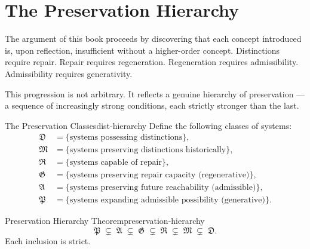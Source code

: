 \documentclass[12pt,twoside,openright]{book}
\begin{document}
\section{The Preservation Hierarchy}
\label{sec:ch30-hierarchy}

The argument of this book proceeds by discovering that
each concept introduced is, upon reflection, insufficient
without a higher-order concept. Distinctions require
repair. Repair requires regeneration. Regeneration
requires admissibility. Admissibility requires generativity.

This progression is not arbitrary. It reflects a genuine
hierarchy of preservation — a sequence of increasingly
strong conditions, each strictly stronger than the last.

\begin{definition}{The Preservation Classes}{dist-hierarchy}
  Define the following classes of systems:
  \begin{align*}
    \mathfrak{D} &= \{\text{systems possessing distinctions}\}, \\
    \mathfrak{M} &= \{\text{systems preserving distinctions historically}\}, \\
    \mathfrak{R} &= \{\text{systems capable of repair}\}, \\
    \mathfrak{G} &= \{\text{systems preserving repair capacity (regenerative)}\}, \\
    \mathfrak{A} &= \{\text{systems preserving future reachability (admissible)}\}, \\
    \mathfrak{P} &= \{\text{systems expanding admissible possibility (generative)}\}.
  \end{align*}
\end{definition}

\begin{theorem}{Preservation Hierarchy Theorem}{preservation-hierarchy}
  \[
    \mathfrak{P}
    \;\subsetneq\;
    \mathfrak{A}
    \;\subsetneq\;
    \mathfrak{G}
    \;\subsetneq\;
    \mathfrak{R}
    \;\subsetneq\;
    \mathfrak{M}
    \;\subsetneq\;
    \mathfrak{D}.
  \]
  Each inclusion is strict.
\end{theorem}
\end{document}
